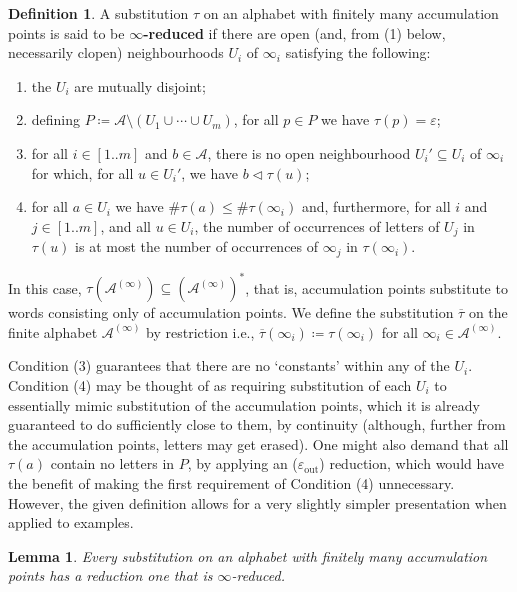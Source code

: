 \documentclass[11pt]{amsart}
\numberwithin{equation}{section}
\theoremstyle{plain}
\newtheorem{lemma}[theorem]{Lemma}
\theoremstyle{definition}
\newtheorem{definition}[theorem]{Definition}
\newcommand{\mc}{\mathcal}
\newcommand{\A}{\mc A}
\begin{document}
\begin{definition}
A substitution \(\tau\) on an alphabet with finitely many accumulation points is said to be \textbf{\(\infty\)-reduced} if there are open (and, from (1) below, necessarily clopen) neighbourhoods \(U_i\) of \(\infty_i\) satisfying the following:
\begin{enumerate}
	\item the \(U_i\) are mutually disjoint;
	\item defining \(P \coloneqq \A \setminus (U_1 \cup \cdots \cup U_m)\), for all \(p \in P\) we have \(\tau(p) = \varepsilon\);
	\item for all \(i \in [1..m]\) and \(b \in \A\), there is no open neighbourhood \(U_i' \subseteq U_i\) of \(\infty_i\) for which, for all \(u \in U_i'\), we have \(b \triangleleft \tau(u)\);
	\item for all \(a \in U_i\) we have \(\# \tau(a) \leq \# \tau(\infty_i)\) and, furthermore, for all \(i\) and \(j \in [1..m]\), and all \(u \in U_i\), the number of occurrences of letters of \(U_j\) in \(\tau(u)\) is at most the number of occurrences of \(\infty_j\) in \(\tau(\infty_i)\).
\end{enumerate}
In this case, \(\tau(\A^{(\infty)}) \subseteq (\A^{(\infty)})^\ast\), that is, accumulation points substitute to words consisting only of accumulation points. We define the substitution \(\overline{\tau}\) on the finite alphabet \(\A^{(\infty)}\) by restriction i.e., \(\overline{\tau}(\infty_i) \coloneqq \tau(\infty_i)\) for all \(\infty_i \in \A^{(\infty)}\).
\end{definition}

Condition (3) guarantees that there are no `constants' within any of the \(U_i\). Condition (4) may be thought of as requiring substitution of each \(U_i\) to essentially mimic substitution of the accumulation points, which it is already guaranteed to do sufficiently close to them, by continuity (although, further from the accumulation points, letters may get erased). One might also demand that all \(\tau(a)\) contain no letters in \(P\), by applying an (\(\varepsilon_\mathrm{out}\)) reduction, which would have the benefit of making the first requirement of Condition (4) unnecessary. However, the given definition allows for a very slightly simpler presentation when applied to examples.

\begin{lemma}\label{lem:infinity-reduction exists}
Every substitution on an alphabet with finitely many accumulation points has a reduction one that is \(\infty\)-reduced.
\end{lemma}
\end{document}
